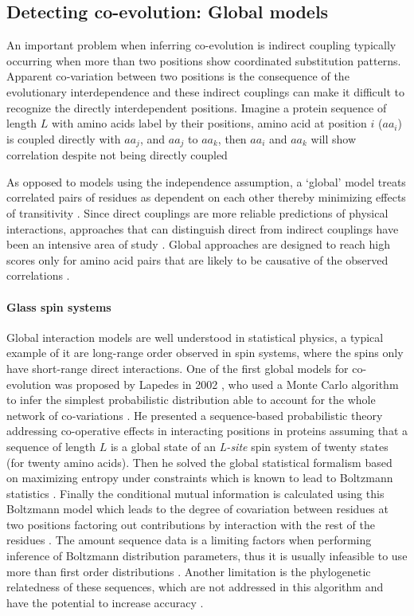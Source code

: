 \subsection{Detecting co-evolution: Global models}

An important problem when inferring co-evolution is indirect coupling typically occurring when more than two positions show coordinated substitution patterns.
Apparent co‐variation between two positions is the consequence of the evolutionary interdependence and these indirect couplings can make it difficult to recognize the directly interdependent positions.
Imagine a protein sequence of length $L$ with amino acids label by their positions, amino acid at position $i$ ($aa_i$) is coupled directly with $aa_j$, and $aa_j$ to $aa_k$, then $aa_i$ and $aa_k$ will show correlation despite not being directly coupled \cite{weigt2009identification}

As opposed to models using the independence assumption, a `global' model treats correlated pairs of residues as dependent on each other thereby minimizing effects of transitivity  \cite{marks2012protein}.
Since direct couplings are more reliable predictions of physical interactions, approaches that can distinguish direct from indirect couplings have been an intensive area of study \cite{de2013emerging}.
Global approaches are designed to reach high scores only for amino acid pairs that are likely to be causative of the observed correlations  \cite{marks2012protein}.


\paragraph{Glass spin systems}
Global interaction models are well understood in statistical physics, a typical example of it are long-range order observed in spin systems, where the spins only have short-range direct interactions.  \cite{marks2012protein:REF}
One of the first global models for co-evolution was proposed by Lapedes in 2002 \cite{lapedes2012using}, who used a Monte Carlo algorithm to infer the simplest probabilistic distribution able to account for the whole network of co‐variations \cite{de2013emerging}.
He presented a sequence-based probabilistic theory addressing co-operative effects in interacting positions in proteins assuming that a sequence of length $L$ is a global state of an \textit{L-site} spin system of twenty states (for twenty amino acids).
Then he solved the global statistical formalism based on maximizing entropy under constraints which is known to lead to Boltzmann statistics \cite{marks2012protein}.
Finally the conditional mutual information is calculated using this Boltzmann model which leads to the degree of covariation between residues at two positions factoring out contributions by interaction with the rest of the residues \cite{marks2012protein}.
The amount sequence data is a limiting factors when performing inference of Boltzmann distribution parameters, thus it is usually infeasible to use more than first order distributions \cite{lapedes2012using}.
Another limitation is the phylogenetic relatedness of these sequences, which are not addressed in this algorithm and have the potential to increase accuracy \cite{lapedes2012using}.

